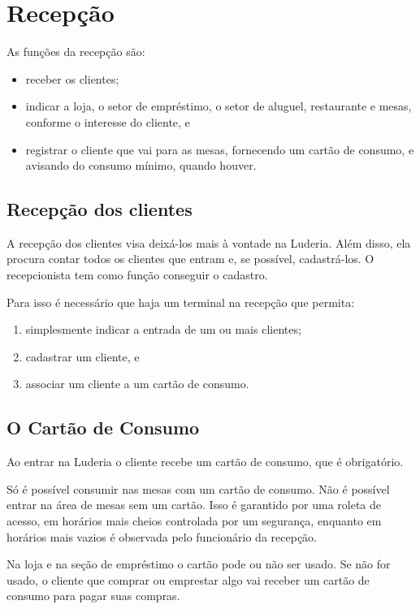 \chapter{Recepção}
\label{chap:recepcao}

As funções da recepção são:
\begin{itemize}
    \item receber os clientes;
    \item indicar a loja, o setor de empréstimo, o setor de aluguel, restaurante e mesas, conforme o interesse do cliente, e
    \item registrar o cliente que vai para as mesas, fornecendo um cartão de consumo, e avisando do consumo mínimo, quando houver.
\end{itemize}

\section{Recepção dos clientes}

A recepção dos clientes visa deixá-los mais à vontade na Luderia. Além disso, ela procura contar todos os clientes que entram e, se possível, cadastrá-los. O recepcionista tem como função conseguir o cadastro.

Para isso é necessário que haja um terminal na recepção que permita:
\begin{enumerate}
    \item simplesmente indicar a entrada de um ou mais clientes;
    \item cadastrar um cliente, e
    \item associar um cliente a um cartão de consumo.
\end{enumerate}

\section{O Cartão de Consumo}

Ao entrar na Luderia o cliente recebe um cartão de consumo, que é obrigatório. 

Só é possível consumir nas mesas com um cartão de consumo. 
Não é possível entrar na área de mesas sem um cartão. Isso é garantido por uma roleta de acesso, em horários mais cheios controlada por um segurança, enquanto em horários mais vazios é observada pelo funcionário da recepção.

Na loja e na seção de empréstimo o cartão pode ou não ser usado. Se não for usado, o cliente que comprar ou emprestar algo vai receber um cartão de consumo para pagar suas compras. 

